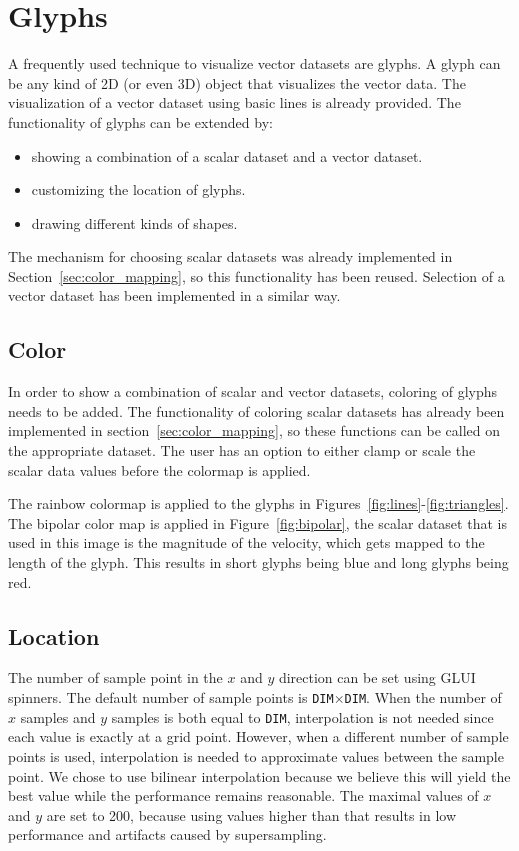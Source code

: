 \section{Glyphs}
	\label{sec:glyphs}
	A frequently used technique to visualize vector datasets are glyphs.
	A glyph can be any kind of 2D (or even 3D) object that visualizes the vector data.
	The visualization of a vector dataset using basic lines is already provided.
	The functionality of glyphs can be extended by:
	\begin{itemize}
		\item showing a combination of a scalar dataset and a vector dataset.
		\item customizing the location of glyphs.
		\item drawing different kinds of shapes.
	\end{itemize}

	The mechanism for choosing scalar datasets was already implemented in Section~\ref{sec:color_mapping}, so this functionality has been reused. 
	Selection of a vector dataset has been implemented in a similar way. 

	\subsection{Color}
		In order to show a combination of scalar and vector datasets, coloring of glyphs needs to be added.
		The functionality of coloring scalar datasets has already been implemented in section~\ref{sec:color_mapping}, so these functions can be called on the appropriate dataset.
		The user has an option to either clamp or scale the scalar data values before the colormap is applied.
		
		The rainbow colormap is applied to the glyphs in Figures~\ref{fig:lines}-\ref{fig:triangles}.
		The bipolar color map is applied in Figure~\ref{fig:bipolar}, the scalar dataset that is used in this image is the magnitude of the velocity, which gets mapped to the length of the glyph.
		This results in short glyphs being blue and long glyphs being red.  

	\subsection{Location}
		The number of sample point in the $x$ and $y$ direction can be set using GLUI spinners.
		The default number of sample points is \texttt{DIM}$\times$\texttt{DIM}.
		When the number of $x$ samples and $y$ samples is both equal to \texttt{DIM}, interpolation is not needed since each value is exactly at a grid point.
		However, when a different number of sample points is used, interpolation is needed to approximate values between the sample point.
		We chose to use bilinear interpolation because we believe this will yield the best value while the performance remains reasonable.
		The maximal values of $x$ and $y$ are set to 200, because using values higher than that results in low performance and artifacts caused by supersampling.

